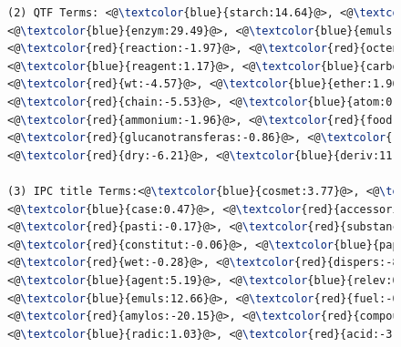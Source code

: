 \begin{figure}[htpb]
\begin{framed}
\begin{lstlisting}[basicstyle=\small\ttfamily , linewidth=\columnwidth,breaklines=true, language=TeX]
(2) QTF Terms: <@\textcolor{blue}{starch:14.64}@>, <@\textcolor{blue}{emulsifi:6.72}@>, <@\textcolor{red}{succin:-3.46}@>, 
<@\textcolor{blue}{enzym:29.49}@>, <@\textcolor{blue}{emuls:12.66}@>, <@\textcolor{blue}{hydrophob:5.45}@>, <@\textcolor{red}{anhydrid:-5.47}@>, 
<@\textcolor{red}{reaction:-1.97}@>, <@\textcolor{red}{octenyl:-0.66}@>, <@\textcolor{blue}{stabil:3.64}@>, <@\textcolor{blue}{alkenyl:0.06}@>, 
<@\textcolor{blue}{reagent:1.17}@>, <@\textcolor{blue}{carbon:0.12}@>, <@\textcolor{blue}{potato:3.74}@>, <@\textcolor{red}{alkyl:-0.33}@>, 
<@\textcolor{red}{wt:-4.57}@>, <@\textcolor{blue}{ether:1.96}@>, <@\textcolor{red}{enzymat:-3.45}@>, <@\textcolor{blue}{convers:10.44}@>, 
<@\textcolor{red}{chain:-5.53}@>, <@\textcolor{blue}{atom:0.03}@>, <@\textcolor{red}{ph:-4.55}@>, <@\textcolor{red}{treat:-0.89}@>, 
<@\textcolor{red}{ammonium:-1.96}@>, <@\textcolor{red}{food:-11.94}@>, <@\textcolor{red}{amylos:-20.15}@>, 
<@\textcolor{red}{glucanotransferas:-0.86}@>, <@\textcolor{red}{glycidyl:-0.40}@>, <@\textcolor{red}{glycosyl:-0.02}@>, 
<@\textcolor{red}{dry:-6.21}@>, <@\textcolor{blue}{deriv:11.97}@>, <@\textcolor{blue}{transferas:0.89}@>, <@\textcolor{red}{foam:-0.49}@>, 

(3) IPC title Terms:<@\textcolor{blue}{cosmet:3.77}@>, <@\textcolor{blue}{toilet:0.18}@>, <@\textcolor{red}{prepar:-0.82}@>, 
<@\textcolor{blue}{case:0.47}@>, <@\textcolor{red}{accessori:-0.01}@>, <@\textcolor{red}{store:-0.37}@>, <@\textcolor{blue}{handl:0.07}@>, 
<@\textcolor{red}{pasti:-0.17}@>, <@\textcolor{red}{substanc:-1.21}@>, <@\textcolor{red}{fibrou:-0.01}@>, <@\textcolor{red}{pulp:-1.28}@>, 
<@\textcolor{red}{constitut:-0.06}@>, <@\textcolor{blue}{paper:1.26}@>, <@\textcolor{red}{impregn:-0.11}@>, <@\textcolor{blue}{emulsifi:6.72}@>, 
<@\textcolor{red}{wet:-0.28}@>, <@\textcolor{red}{dispers:-8.66}@>, <@\textcolor{red}{foam:-0.49}@>, <@\textcolor{red}{produc:-0.57}@>, 
<@\textcolor{blue}{agent:5.19}@>, <@\textcolor{blue}{relev:0.18}@>, <@\textcolor{blue}{class:0.053}@>, <@\textcolor{red}{lubric:-0.38}@>, 
<@\textcolor{blue}{emuls:12.66}@>, <@\textcolor{red}{fuel:-0.011}@>, <@\textcolor{blue}{deriv:11.97}@>, <@\textcolor{blue}{starch:14.64}@>, 
<@\textcolor{red}{amylos:-20.15}@>, <@\textcolor{red}{compound:-0.63}@>, <@\textcolor{red}{saccharid:-11.95}@>, 
<@\textcolor{blue}{radic:1.03}@>, <@\textcolor{red}{acid:-3.19}@> 


\end{lstlisting}
\end{framed}
\end{figure}

